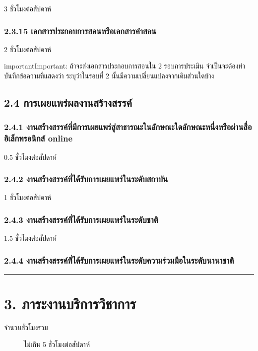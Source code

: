 \documentclass[a4paper,12pt,english]{sphinxmanual}
\begin{document}
3 ชั่วโมงต่อสัปดาห์


\subsubsection{2.3.15 เอกสารประกอบการสอนหรือเอกสารคำสอน}
\label{\detokenize{workload_rubric:id46}}
2 ชั่วโมงต่อสัปดาห์

\begin{sphinxadmonition}{important}{Important:}
ถ้าจะส่งเอกสารประกอบการสอนใน 2 รอบการประเมิน จำเป็นจะต้องทำบันทึกข้อความที่แสดงว่า ระบุว่าในรอบที่ 2 นั้นมีความเปลี่ยนแปลงจากเดิมส่วนใดบ้าง
\end{sphinxadmonition}


\subsection{2.4 การเผยแพร่ผลงานสร้างสรรค์}
\label{\detokenize{workload_rubric:id47}}

\subsubsection{2.4.1 งานสร้างสรรค์ที่มีการเผยแพร่สู่สาธารณะในลักษณะใดลักษณะหนึ่งหรือผ่านสื่ออิเล็กทรอนิกส์ online}
\label{\detokenize{workload_rubric:online}}
0.5 ชั่วโมงต่อสัปดาห์


\subsubsection{2.4.2 งานสร้างสรรค์ที่ได้รับการเผยแพร่ในระดับสถาบัน}
\label{\detokenize{workload_rubric:id48}}
1 ชั่วโมงต่อสัปดาห์


\subsubsection{2.4.3 งานสร้างสรรค์ที่ได้รับการเผยแพร่ในระดับชาติ}
\label{\detokenize{workload_rubric:id49}}
1.5 ชั่วโมงต่อสัปดาห์


\subsubsection{2.4.4 งานสร้างสรรค์ที่ได้รับการเผยแพร่ในระดับความร่วมมือในระดับนานาชาติ}
\label{\detokenize{workload_rubric:id50}}

\bigskip\hrule\bigskip



\section{3. ภาระงานบริการวิชาการ}
\label{\detokenize{workload_rubric:id51}}\begin{description}
\item[{จำนวนชั่วโมงรวม}] \leavevmode
ไม่เกิน 5 ชั่วโมงต่อสัปดาห์

\end{description}
\end{document}
